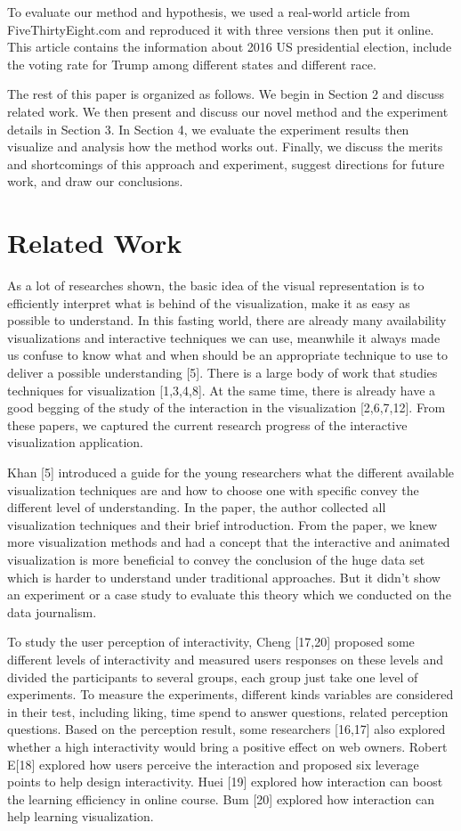 \documentclass[9pt,journal,compsoc]{IEEEtran}
\begin{document}
To evaluate our method and hypothesis, we used a real-world article from FiveThirtyEight.com and reproduced it with three versions then put it online. This article contains the information about 2016 US presidential election, include the voting rate for Trump among different states and different race.

The rest of this paper is organized as follows. We begin in Section 2 and discuss related work. We then present and discuss our novel method and the experiment details in Section 3. In Section 4, we evaluate the experiment results then visualize and analysis how the method works out. Finally, we discuss the merits and shortcomings of this approach and experiment, suggest directions for future work, and draw our conclusions.

\section{Related Work}
\large
As a lot of researches shown, the basic idea of the visual representation is to efficiently interpret what is behind of the visualization, make it as easy as possible to understand. In this fasting world, there are already many availability visualizations and interactive techniques we can use, meanwhile it always made us confuse to know what and when should be an appropriate technique to use to deliver a possible understanding [5]. There is a large body of work that studies techniques for visualization [1,3,4,8]. At the same time, there is already have a good begging of the study of the interaction in the visualization [2,6,7,12]. From these papers, we captured the current research progress of the interactive visualization application.

Khan [5] introduced a guide for the young researchers what the different available visualization techniques are and how to choose one with specific convey the different level of understanding. In the paper, the author collected all visualization techniques and their brief introduction. From the paper, we knew more visualization methods and had a concept that the interactive and animated visualization is more beneficial to convey the conclusion of the huge data set which is harder to understand under traditional approaches. But it didn't show an experiment or a case study to evaluate this theory which we conducted on the data journalism.

To study the user perception of interactivity, Cheng [17,20] proposed some different levels of interactivity and measured users responses on these levels and divided the participants to several groups, each group just take one level of experiments. To measure the experiments, different kinds variables are considered in their test, including liking, time spend to answer questions, related perception questions. Based on the perception result, some researchers [16,17] also explored whether a high interactivity would bring a positive effect on web owners. Robert E[18] explored how users perceive the interaction and proposed six leverage points to help design interactivity. Huei [19] explored how interaction can boost the learning efficiency in online course. Bum [20] explored how interaction can help learning visualization.
  
\end{document}
